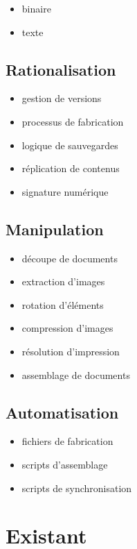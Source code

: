 \documentclass[12pt]{extarticle}
\begin{document}
\begin{itemize}
\item{binaire}
\item{texte}
\end{itemize}

\subsection{Rationalisation}
\begin{itemize}
\item{gestion de versions}
\item{processus de fabrication}
\item{logique de sauvegardes}
\item{réplication de contenus}
\item{signature numérique}
\end{itemize}

\pagebreak
\subsection{Manipulation}
\begin{itemize}
\item{découpe de documents}
\item{extraction d’images}
\item{rotation d’éléments}
\item{compression d’images}
\item{résolution d’impression}
\item{assemblage de documents}
\end{itemize}

\subsection{Automatisation}
\begin{itemize}
\item{fichiers de fabrication}
\item{scripts d’assemblage}
\item{scripts de synchronisation}
\end{itemize}

\pagebreak
\section{Existant}
\end{document}

